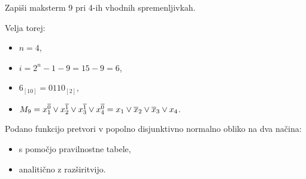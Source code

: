 \begin{zgled}
Zapiši maksterm 9 pri 4-ih vhodnih spremenljivkah.
\end{zgled}
\begin{resitev}
Velja torej:
\begin{itemize}
\item $n=4$,
\item $i = 2^n-1 - 9=15-9=6$,
\item $6_{[10]} = 0110_{[2]}$,
\item $M_9 = x_1^{\overline 0} \vee x_2^{\overline 1} \vee x_3^{\overline 1} \vee x_4^{\overline 0} = x_1 \vee \overline x_2 \vee \overline x_3 \vee x_4$.
\end{itemize}
\end{resitev}

\begin{zgled}
Podano funkcijo pretvori v popolno disjunktivno normalno obliko na dva načina:
\begin{itemize}
\item{s pomočjo pravilnostne tabele},
\item{analitično z razširitvijo}.
\end{itemize}
\end{zgled}
